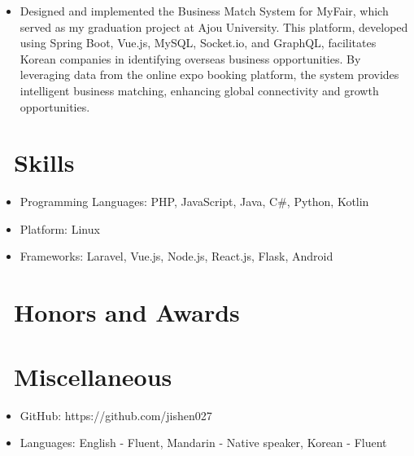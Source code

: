 \documentclass{resume}
\begin{document}
\begin{itemize}
  \item Designed and implemented the Business Match System for MyFair, which served as my graduation project at Ajou University. This platform, developed using Spring Boot, Vue.js, MySQL, Socket.io, and GraphQL, facilitates Korean companies in identifying overseas business opportunities. By leveraging data from the online expo booking platform, the system provides intelligent business matching, enhancing global connectivity and growth opportunities.
\end{itemize}

\section{\faCogs\ Skills}
\begin{itemize}[parsep=0.5ex]
  \item Programming Languages: PHP, JavaScript, Java, C\#, Python, Kotlin
  \item Platform: Linux
  \item Frameworks: Laravel, Vue.js, Node.js, React.js, Flask, Android
\end{itemize}

\section{\faHeartO\ Honors and Awards}

\section{\faInfo\ Miscellaneous}
\begin{itemize}[parsep=0.5ex]
  \item GitHub: https://github.com/jishen027
  \item Languages: English - Fluent, Mandarin - Native speaker, Korean - Fluent
\end{itemize}

%
%
\end{document}
